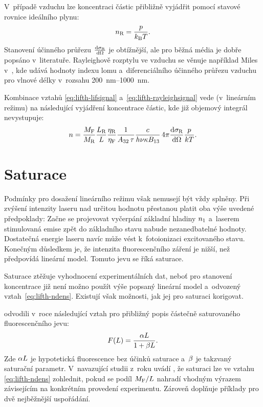 V~případě vzduchu lze koncentraci částic přibližně vyjádřit pomocí
stavové rovnice ideálního plynu:
\begin{equation}
	n_\text{R} = \frac{p}{k_\text{B}T}.
\end{equation}
Stanovení účinného průřezu $\dv{\sigma_\text{R}}{\Omega}$ je obtížnější,
ale pro běžná média je dobře popsáno v~literatuře.
Rayleighově rozptylu ve vzduchu se věnuje například Miles v~\cite{rayleigh},
kde udává hodnoty indexu lomu a~diferenciálního účinného průřezu vzduchu
pro vlnové délky v~rozsahu \SIrange{200}{1000}{\nano\metre}.

Kombinace vztahů \eqref{eq:lifth-lifsignal} a~\eqref{eq:lifth-rayleighsignal}
vede (v~lineárním režimu) na následující vyjádření koncentrace částic,
kde již objemový integrál nevystupuje:
\begin{equation}
	\label{eq:lifth-ndens}
	n = \frac{M_\text{F}}{M_\text{R}}
	\frac{L_\text{R}}{L}\frac{\eta_\text{R}}{\eta_\text{F}}
	\frac{1}{A_{32}\,\tau}
	\frac{c}{h\nu\kappa B_{13}}
	\, 4\pi \dv{\sigma_\text{R}}{\Omega} \frac{p}{kT}.
\end{equation}

\section{Saturace}
\label{sec:lifth-saturation}
Podmínky pro dosažení lineárního režimu však nemusejí být vždy splněny.
Při zvýšení intenzity laseru nad určitou hodnotu přestanou platit oba
výše uvedené předpoklady:
Začne se projevovat vyčerpání základní hladiny $n_1$
a~laserem stimulovaná emise zpět do základního stavu nabude nezanedbatelné
hodnoty.
Dostatečná energie laseru navíc může vést k~fotoionizaci excitovaného stavu.
Konečným důsledkem je, že intenzita fluorescenčního záření je nižší,
než předpovídá lineární model.
Tomuto jevu se říká saturace.

Saturace ztěžuje vyhodnocení experimentálních dat, neboť pro stanovení
koncentrace již není možno použít výše popsaný lineární model
a~odvozený vztah~\eqref{eq:lifth-ndens}.
Existují však možnosti, jak jej pro saturaci korigovat.

 odvodili v~roce \citeyear{lif-saturation}
následující vztah pro přibližný popis částečně saturovaného
fluorescenčního jevu\autocite{lif-saturation}:
\begin{equation}
	F(L) = \frac{\alpha L}{1 + \beta L}.
\end{equation}
Zde $\alpha L$ je hypotetická fluorescence bez účinků saturace
a~$\beta$ je takzvaný saturační parametr.
V~navazující studii z~roku \citeyear{lif-pb} uvádí \citeauthor{lif-pb},
že saturaci lze ve vztahu \eqref{eq:lifth-ndens} zohlednit,
pokud se podíl $M_\text{F}/L$ nahradí vhodným výrazem
závisejícím na konkrétním provedení experimentu.
Zároveň doplňuje příklady pro dvě nejběžnější uspořádání.%
\autocite{lif-pb}

